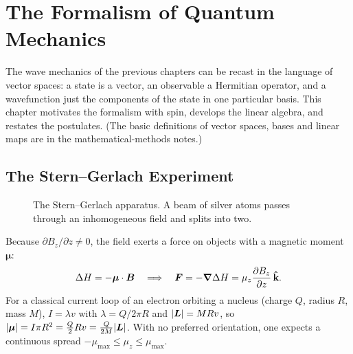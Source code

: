\chapter{The Formalism of Quantum Mechanics}
\label{ch:formalism}

The wave mechanics of the previous chapters can be recast in the language of vector spaces: a state is a vector, an observable a Hermitian operator, and a wavefunction just the components of the state in one particular basis. This chapter motivates the formalism with spin, develops the linear algebra, and restates the postulates. (The basic definitions of vector spaces, bases and linear maps are in the mathematical-methods notes.)

\section{The Stern--Gerlach Experiment}

\begin{figure}[ht]
\centering
{}
\caption{The Stern--Gerlach apparatus. A beam of silver atoms passes through an inhomogeneous field and splits into two.}
\end{figure}

Because $\partial B_z/\partial z\neq0$, the field exerts a force on objects with a magnetic moment $\bm{\mu}$:
\[
    \Delta H = -\bm{\mu}\cdot\vect{B}
    \quad\Longrightarrow\quad
    \vect{F} = -\grad\Delta H = \mu_z\pdv{B_z}{z}\,\khat .
\]
For a classical current loop of an electron orbiting a nucleus (charge $Q$, radius $R$, mass $M$), $I = \lambda v$ with $\lambda = Q/2\pi R$ and $|\vect{L}| = MRv$, so $|\bm{\mu}| = I\pi R^2 = \frac{Q}{2}Rv = \frac{Q}{2M}|\vect{L}|$. With no preferred orientation, one expects a continuous spread $-\mu_{\max}\le\mu_z\le\mu_{\max}$.

